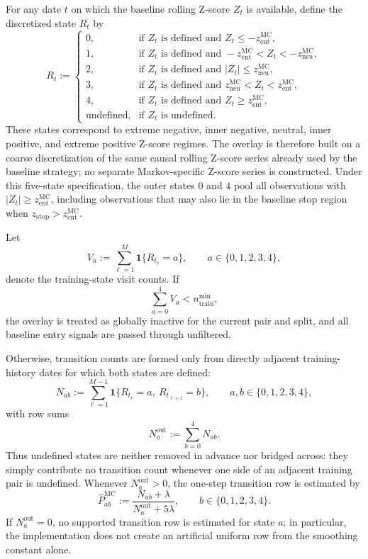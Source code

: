 \documentclass[11pt,a4paper]{article}
\begin{document}
For any date \(t\) on which the baseline rolling Z-score \(Z_t\) is available,
define the discretized state \(R_t\) by
\[
  R_t
  :=
  \begin{cases}
    0, & \text{if } Z_t \text{ is defined and } Z_t \le -z_{\mathrm{ent}}^{\mathrm{MC}},\\
    1, & \text{if } Z_t \text{ is defined and } -z_{\mathrm{ent}}^{\mathrm{MC}} < Z_t < -z_{\mathrm{neu}}^{\mathrm{MC}},\\
    2, & \text{if } Z_t \text{ is defined and } |Z_t| \le z_{\mathrm{neu}}^{\mathrm{MC}},\\
    3, & \text{if } Z_t \text{ is defined and } z_{\mathrm{neu}}^{\mathrm{MC}} < Z_t < z_{\mathrm{ent}}^{\mathrm{MC}},\\
    4, & \text{if } Z_t \text{ is defined and } Z_t \ge z_{\mathrm{ent}}^{\mathrm{MC}},\\
    \text{undefined}, & \text{if } Z_t \text{ is undefined}.
  \end{cases}
\]
These states correspond to extreme negative, inner negative, neutral, inner
positive, and extreme positive Z-score regimes. The overlay is therefore built
on a coarse discretization of the same causal rolling Z-score series already
used by the baseline strategy; no separate Markov-specific Z-score series is
constructed. Under this five-state specification, the outer states \(0\) and
\(4\) pool all observations with
\(|Z_t| \ge z_{\mathrm{ent}}^{\mathrm{MC}}\), including observations that may
also lie in the baseline stop region when
\(z_{\mathrm{stop}} > z_{\mathrm{ent}}^{\mathrm{MC}}\).

Let
\[
  V_a
  :=
  \sum_{\ell=1}^{M}
  \mathbf 1\{R_{t_\ell}=a\},
  \qquad a \in \{0,1,2,3,4\},
\]
denote the training-state visit counts. If
\[
  \sum_{a=0}^4 V_a < n_{\mathrm{train}}^{\min},
\]
the overlay is treated as globally inactive for the current pair and split, and
all baseline entry signals are passed through unfiltered.

Otherwise, transition counts are formed only from directly adjacent
training-history dates for which both states are defined:
\[
  N_{ab}
  :=
  \sum_{\ell=1}^{M-1}
  \mathbf 1\{R_{t_\ell}=a,\ R_{t_{\ell+1}}=b\},
  \qquad a,b \in \{0,1,2,3,4\},
\]
with row sums
\[
  N_a^{\mathrm{out}}
  :=
  \sum_{b=0}^4 N_{ab}.
\]
Thus undefined states are neither removed in advance nor bridged across:
they simply contribute no transition count whenever one side of an adjacent
training pair is undefined. Whenever \(N_a^{\mathrm{out}}>0\), the one-step
transition row is estimated by
\[
  \widehat P^{\mathrm{MC}}_{ab}
  :=
  \frac{N_{ab}+\lambda}{N_a^{\mathrm{out}}+5\lambda},
  \qquad b \in \{0,1,2,3,4\}.
\]
If \(N_a^{\mathrm{out}}=0\), no supported transition row is estimated for state
\(a\); in particular, the implementation does not create an artificial uniform
row from the smoothing constant alone.
\end{document}
